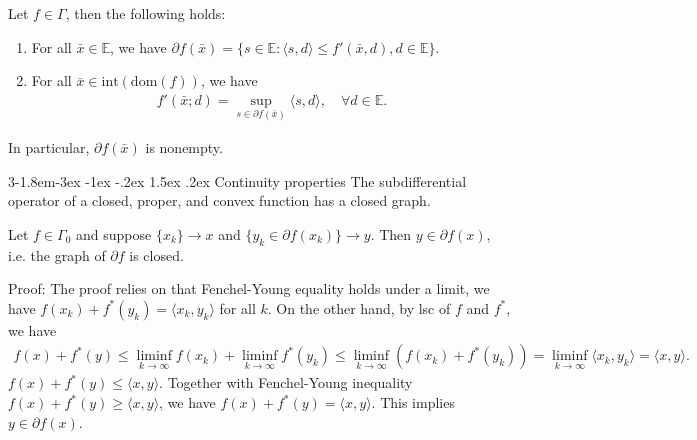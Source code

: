 \documentclass{tufte-handout}
\makeatletter
\renewcommand{\subsection}{\@startsection{subsection}%
    {3}{-1.8em}{-3ex \@plus -1ex \@minus -.2ex}%
    {1.5ex \@plus .2ex}
    {\hspace*{-5.5em}\fcolorbox{ltblue}{ltblue}{\parbox[c][1.0ex][b]{4em}{\phantom{space}}}
    \normalfont\large\itshape\color{ltblue}}}
\makeatother
\begin{document}
\begin{Theorem}
    Let \( f\in \Gamma \), then the following holds:
    \begin{enumerate}
        \item For all \( \bar x \in \mathbb{E}\), we have 
        \(\partial f(\bar x) = \{s \in \mathbb{E}:\langle s,d\rangle \leq f'(\bar x , d), d \in \mathbb{E}\}
        \).
        \item For all \( \bar x \in \text{int}(\text{dom}(f)) \), we have
        \begin{align}
            f'(\bar x; d) = \sup_{s \in \partial f(\bar x)} \langle s, d \rangle, \quad \forall d \in \mathbb{E}.
        \end{align}
    \end{enumerate}
    In particular, \( \partial f(\bar x) \) is nonempty.
\end{Theorem}

\subsection{Continuity properties}
The subdifferential operator of a closed, proper, and convex function has a closed graph.
\begin{Corollary}
    Let \( f\in \Gamma_0 \) and suppose \( \{x_k\} \to x \) and 
    \( \{y_k \in \partial f(x_k)\} \to y \). Then \( y \in \partial f(x) \), i.e. the graph of \( \partial f \) is closed.
\end{Corollary}
Proof: The proof relies on that Fenchel-Young equality holds under a limit, 
we have \( f(x_k) + f^*(y_k) = \langle x_k, y_k \rangle \) for all \( k \). 
On the other hand, by lsc of \( f \) and \( f^* \), we have
\begin{align}
    f(x) + f^*(y) \leq \liminf_{k\to\infty} f(x_k) + \liminf_{k\to\infty} f^*(y_k) \leq \liminf_{k\to\infty} (f(x_k) + f^*(y_k)) = \liminf_{k\to\infty} \langle x_k, y_k \rangle = \langle x, y \rangle.
\end{align}
\( f(x) + f^*(y) \leq \langle x,y\rangle \). Together with Fenchel-Young inequality \( f(x) + f^*(y) \geq \langle x, y \rangle \), we have \( f(x) + f^*(y) = \langle x, y \rangle \).
This implies \( y \in \partial f(x) \).
\hfill\qedsymbol
\end{document}
